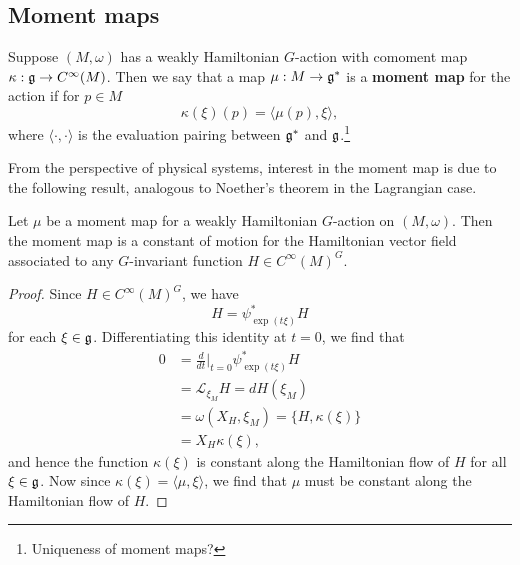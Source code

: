\documentclass{amsart}
\begin{document}
\subsection{Moment maps}

\begin{definition}
    Suppose $(M,\omega)$ has a weakly Hamiltonian $G$-action with comoment map $\kappa:\mathfrak g\to C^\infty(M)$.
    Then we say that a map $\mu:M\to \mathfrak g^*$ is a \textbf{moment map} for the action if for $p\in M$
    \begin{equation*}
        \kappa(\xi)(p) = \langle \mu(p), \xi\rangle,
    \end{equation*}
    where $\langle\cdot,\cdot\rangle$ is the evaluation pairing between $\mathfrak g^*$ and $\mathfrak g$.\footnote{Uniqueness of moment maps?}
\end{definition}

From the perspective of physical systems, interest in the moment map is due to the following
result, analogous to Noether's theorem in the Lagrangian case.

\begin{theorem}
    Let $\mu$ be a moment map for a weakly Hamiltonian $G$-action on $(M,\omega)$. Then the
    moment map is a constant of motion for the Hamiltonian vector field associated to any
    $G$-invariant function $H\in C^\infty(M)^G$.
\end{theorem}
\begin{proof}
    Since $H\in C^\infty(M)^G$, we have
    \begin{equation*}
        H=\psi_{\exp(t\xi)}^*H
    \end{equation*}
    for each $\xi\in\mathfrak g$. Differentiating this identity at $t=0$, we find that
    \begin{align*}
        0 &= \frac{d}{dt}\bigg|_{t=0} \psi_{\exp(t\xi)}^*H\\
        &= \mathcal{L}_{\xi_M}H=dH(\xi_M)\\
        &= \omega(X_H,\xi_M)=\{H,\kappa(\xi)\}\\
        &= X_H\kappa(\xi),
    \end{align*}
    and hence the function $\kappa(\xi)$ is constant along the Hamiltonian flow of $H$ for all
    $\xi\in\mathfrak g$.  Now since $\kappa(\xi) = \langle \mu, \xi\rangle$, we find that $\mu$ must be
    constant along the Hamiltonian flow of $H$.
\end{proof}
\end{document}
